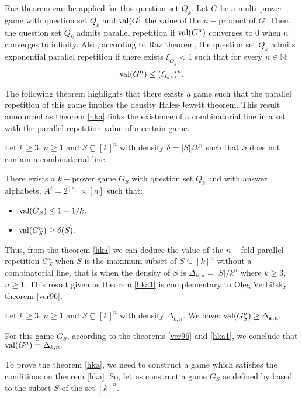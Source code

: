  
Raz theorem can be applied for this question set $Q_k$. Let $G$ be a multi-prover game with question set $Q_k$ and $\mathrm{val} (G^)$ the value of the $n-$product of $G.$  Then, the question set $Q_k$ admits parallel repetition if $ \mathrm{val} (G^n)$ converges to $0$ when $n$ converges to infinity. Also, according to Raz theorem, the question set $Q_k$  admits exponential parallel repetition if there exists $\xi_{Q_k} < 1$ such that for every $n \in \mathbb{N}$: $$\mathrm{val} (G^n) \leq (\xi_{Q_k})^n.$$


The following theorem highlights that there exists a game such that the parallel repetition of this game  implies the density Hales-Jewett theorem. This result announced as theorem \eqref{hka} links the existence of a combinatorial line in a set with the parallel repetition value of a certain game.
 
 \begin{thm} Let $k\geq 3$, $n\geq 1$ and $S\subseteq [k]^n$ with density $\delta=|S|/k^n$ such that $S$ does not contain a combinatorial line.	
 
There exists a $k-$prover game $G_S$ with question set $Q_k$ and with answer alphabets,
$A^t = 2^{[n]} \times [n]$ such that:
\begin{itemize}
\item $\mathrm{val} (G_S) \leq 1-1/k.$ 	\item $\mathrm{val} (G_S^n) \geq \delta(S).$
\end{itemize} \label{hka}
 	\end{thm}

Thus, from the theorem \eqref{hka} we can deduce the value of the $n-$fold parallel repetition $G_S^n$ when $S$ is the maximum subset of  $S\subseteq [k]^n$ without a combinatorial line, that is when the density of $S$ is $\Delta_{k,n}= |S|/k^n$ where $k\geq 3$, $n\geq 1$. This result given as theorem \eqref{hka1} is complementary to  Oleg Verbitsky theorem \eqref{ver96}.

 \begin{thm} Let $k\geq 3$, $n\geq 1$ and $S\subseteq [k]^n$ with density $\Delta_{k,n}$. We have: 	
 $\mathrm{val} (G_S^n) \geq \Delta_{k,n}.$  \label{hka1}
 	\end{thm} 
For this  game $G_S$, according to the theorems \eqref{ver96} and \eqref{hka1}, we conclude that $\mathrm{val} (G^n)=\Delta_{k,n}.$

To prove  the theorem \eqref{hka}, we need to construct a game which  satisfies the conditions on theorem \eqref{hka}. So, let us construct a game $G_S$   as  defined by \cite{hkazla2016forbidden} based to the subset $S $ of the set $[k]^n$. 

